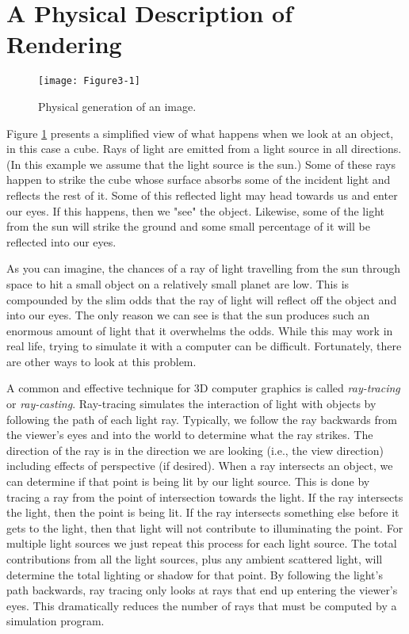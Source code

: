 \section{A Physical Description of Rendering}

\begin{figure}[ht]
  \centering
  \texttt{[image: Figure3-1]}\\
  \caption{Physical generation of an image.}\label{fig:Figure3-1}
\end{figure}

Figure \ref{fig:Figure3-1} presents a simplified view of what happens when we look at an object, in this case a cube. Rays of light are emitted from a light source in all directions. (In this example we assume that the light source is the sun.) Some of these rays happen to strike the cube whose surface absorbs some of the incident light and reflects the rest of it. Some of this reflected light may head towards us and enter our eyes. If this happens, then we "see" the object. Likewise, some of the light from the sun will strike the ground and some small percentage of it will be reflected into our eyes.

As you can imagine, the chances of a ray of light travelling from the sun through space to hit a small object on a relatively small planet are low. This is compounded by the slim odds that the ray of light will reflect off the object and into our eyes. The only reason we can see is that the sun produces such an enormous amount of light that it overwhelms the odds. While this may work in real life, trying to simulate it with a computer can be difficult. Fortunately, there are other ways to look at this problem.

A common and effective technique for 3D computer graphics is called \emph{ray-tracing} or \emph{ray-casting}. Ray-tracing simulates the interaction of light with objects by following the path of each light ray. Typically, we follow the ray backwards from the viewer's eyes and into the world to determine what the ray strikes. The direction of the ray is in the direction we are looking (i.e., the view direction) including effects of perspective (if desired). When a ray intersects an object, we can determine if that point is being lit by our light source. This is done by tracing a ray from the point of intersection towards the light. If the ray intersects the light, then the point is being lit. If the ray intersects something else before it gets to the light, then that light will not contribute to illuminating the point. For multiple light sources we just repeat this process for each light source. The total contributions from all the light sources, plus any ambient scattered light, will determine the total lighting or shadow for that point. By following the light's path backwards, ray tracing only looks at rays that end up entering the viewer's eyes. This dramatically reduces the number of rays that must be computed by a simulation program.


